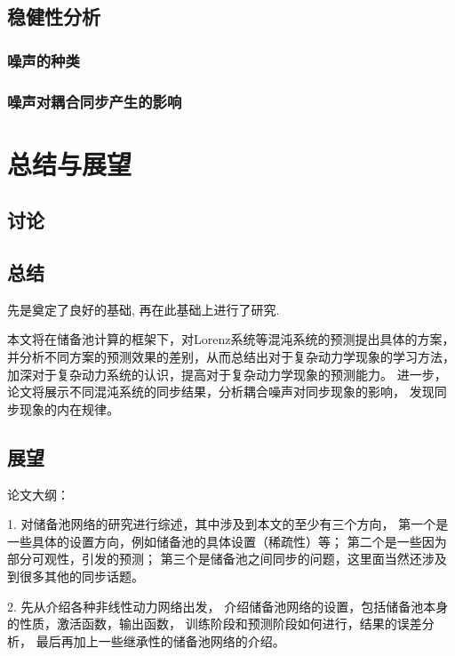 \documentclass[notitlepage,cs4size,punct,oneside]{ctexrep}
\numberwithin{equation}{chapter}
\theoremstyle{mystyle}
\begin{document}
\section{稳健性分析}

\subsection{噪声的种类}

\subsection{噪声对耦合同步产生的影响}


\chapter{总结与展望}

\section{讨论}

\section{总结}
先是奠定了良好的基础, 再在此基础上进行了研究. 

本文将在储备池计算的框架下，对Lorenz系统等混沌系统的预测提出具体的方案，
并分析不同方案的预测效果的差别，从而总结出对于复杂动力学现象的学习方法，
加深对于复杂动力系统的认识，提高对于复杂动力学现象的预测能力。
进一步，论文将展示不同混沌系统的同步结果，分析耦合噪声对同步现象的影响，
发现同步现象的内在规律。
\section{展望}

\clearpage

论文大纲：

1. 对储备池网络的研究进行综述，其中涉及到本文的至少有三个方向，
第一个是一些具体的设置方向，例如储备池的具体设置（稀疏性）等；
第二个是一些因为部分可观性，引发的预测；
第三个是储备池之间同步的问题，这里面当然还涉及到很多其他的同步话题。

\bigskip

2. 先从介绍各种非线性动力网络出发，
介绍储备池网络的设置，包括储备池本身的性质，激活函数，输出函数，
训练阶段和预测阶段如何进行，结果的误差分析，
最后再加上一些继承性的储备池网络的介绍。
\end{document}
